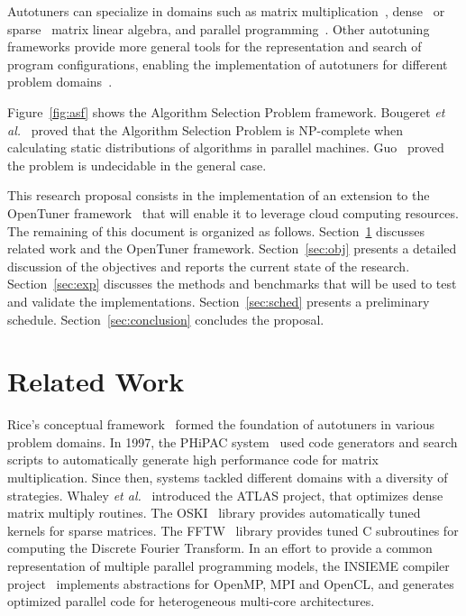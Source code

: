 \documentclass[a4paper, 12pt]{article}
\begin{document}
Autotuners can specialize in domains such as matrix
multiplication~\cite{bilmes1997phipac}, dense~\cite{whaley1998atlas} or
sparse~\cite{vuduc2005oski} matrix linear algebra, and parallel
programming~\cite{jordan2012multi}. Other autotuning frameworks provide more
general tools for the representation and search of program configurations,
enabling the implementation of autotuners for different problem
domains~\cite{ansel2014opentuner,hutter2009paramils}.

Figure~\ref{fig:asf} shows the Algorithm Selection Problem framework.
Bougeret \emph{et al.}~\cite{bougeret2009combining} proved that the Algorithm
Selection Problem is NP-complete when calculating static distributions of
algorithms in parallel machines.  Guo~\cite{guo2003algorithm} proved the
problem is undecidable in the general case.

This research proposal consists in the implementation of an
extension to the OpenTuner framework~\cite{ansel2014opentuner} that will
enable it to leverage cloud computing resources.
The remaining of this document is organized as follows.
Section~\ref{sec:related} discusses related work and the OpenTuner
framework.
Section~\ref{sec:obj} presents a detailed discussion of the objectives
and reports the current state of the research.
Section~\ref{sec:exp} discusses the methods and benchmarks that will be used to
test and validate the implementations.
Section~\ref{sec:sched} presents a preliminary schedule.
Section~\ref{sec:conclusion} concludes the proposal.

\section{Related Work} \label{sec:related}

Rice's conceptual framework~\cite{rice1976algorithm} formed the foundation
of autotuners in various problem domains.  In 1997, the PHiPAC
system~\cite{bilmes1997phipac} used code generators and search scripts to
automatically generate high performance code
for matrix multiplication. Since then, systems tackled different domains with a
diversity of strategies. Whaley \emph{et al.}~\cite{whaley1998atlas} introduced
the ATLAS project, that optimizes dense matrix multiply routines. The
OSKI~\cite{vuduc2005oski} library provides automatically tuned kernels for
sparse matrices. The FFTW~\cite{frigo1998fftw} library provides tuned C
subroutines for computing the Discrete Fourier Transform.  In an effort to
provide a common representation of multiple parallel programming models, the
INSIEME compiler project~\cite{jordan2012multi} implements abstractions for
OpenMP, MPI and OpenCL, and generates optimized parallel code for heterogeneous
multi-core architectures.
\end{document}
